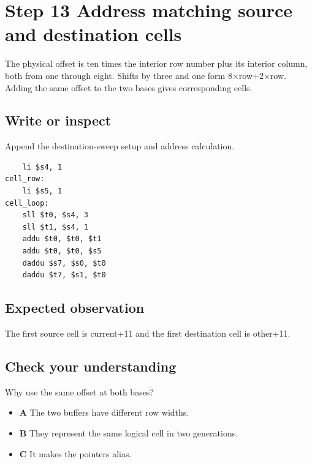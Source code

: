 \section{Step 13 Address matching source and destination
  cells}\label{008-life-generations-s13-step-13-address-matching-source-and-destination-cells}

The physical offset is ten times the interior row number plus its
interior column, both from one through eight. Shifts by three and one
form 8\ensuremath{\times}row+2\ensuremath{\times}row. Adding the same offset to the two bases gives
corresponding cells.

\subsection{Write or
  inspect}\label{008-life-generations-s13-write-or-inspect}

Append the destination-sweep setup and address calculation.

\begin{verbatim}
    li $s4, 1
cell_row:
    li $s5, 1
cell_loop:
    sll $t0, $s4, 3
    sll $t1, $s4, 1
    addu $t0, $t0, $t1
    addu $t0, $t0, $s5
    daddu $s7, $s0, $t0
    daddu $t7, $s1, $t0
\end{verbatim}

\subsection{Expected
  observation}\label{008-life-generations-s13-expected-observation}

The first source cell is current+11 and the first destination cell is
other+11.

\subsection{Check your
  understanding}\label{008-life-generations-s13-check-your-understanding}

Why use the same offset at both bases?

\begin{itemize}
  \tightlist
  \item
        \textbf{A} The two buffers have different row widths.
  \item
        \textbf{B} They represent the same logical cell in two generations.
  \item
        \textbf{C} It makes the pointers alias.
\end{itemize}
